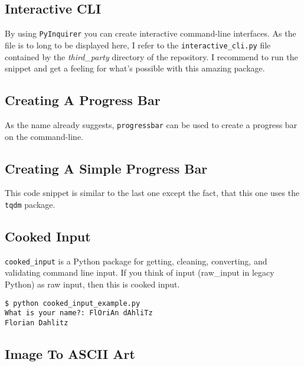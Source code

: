 \subsection{Interactive CLI}

By using \lstinline{PyInquirer} you can create interactive command-line interfaces.
As the file is to long to be displayed here, I refer to the \lstinline{interactive_cli.py} file contained by the \textit{third\_party} directory of the repository.
I recommend to run the snippet and get a feeling for what's possible with this amazing package.


\subsection{Creating A Progress Bar}

As the name already suggests, \lstinline{progressbar} can be used to create a progress bar on the command-line.




\subsection{Creating A Simple Progress Bar}

This code snippet is similar to the last one except the fact, that this one uses the \lstinline{tqdm} package.




\subsection{Cooked Input}

\glqq \lstinline{cooked_input} is a Python package for getting, cleaning, converting, and validating command line input.
If you think of input (raw\_input in legacy Python) as raw input, then this is cooked input.\grqq



\begin{lstlisting}[caption=Output of cooked\_input\_example.py]
$ python cooked_input_example.py
What is your name?: FlOriAn dAhliTz
Florian Dahlitz
\end{lstlisting}


\subsection{Image To ASCII Art}

